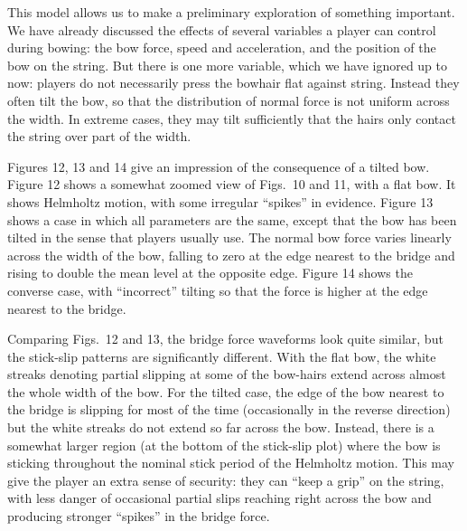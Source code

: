
  This model allows us to make a preliminary exploration of something 
  important. We have already discussed the effects of several variables a 
  player can control during bowing: the bow force, speed and acceleration, and 
  the position of the bow on the string. But there is one more variable, which 
  we have ignored up to now: players do not necessarily press the bowhair flat 
  against string. Instead they often tilt the bow, so that the distribution of 
  normal force is not uniform across the width. In extreme cases, they may tilt 
  sufficiently that the hairs only contact the string over part of the width. 

  Figures 12, 13 and 14 give an impression of the consequence of a tilted bow. 
  Figure 12 shows a somewhat zoomed view of Figs.\ 10 and 11, with a flat bow. 
  It shows Helmholtz motion, with some irregular “spikes” in evidence. Figure 
  13 shows a case in which all parameters are the same, except that the bow has 
  been tilted in the sense that players usually use. The normal bow force 
  varies linearly across the width of the bow, falling to zero at the edge 
  nearest to the bridge and rising to double the mean level at the opposite 
  edge. Figure 14 shows the converse case, with “incorrect” tilting so that the 
  force is higher at the edge nearest to the bridge. 

  Comparing Figs.\ 12 and 13, the bridge force waveforms look quite similar, 
  but the stick-slip patterns are significantly different. With the flat bow, 
  the white streaks denoting partial slipping at some of the bow-hairs extend 
  across almost the whole width of the bow. For the tilted case, the edge of 
  the bow nearest to the bridge is slipping for most of the time (occasionally 
  in the reverse direction) but the white streaks do not extend so far across 
  the bow. Instead, there is a somewhat larger region (at the bottom of the 
  stick-slip plot) where the bow is sticking throughout the nominal stick 
  period of the Helmholtz motion. This may give the player an extra sense of 
  security: they can “keep a grip” on the string, with less danger of 
  occasional partial slips reaching right across the bow and producing stronger 
  “spikes” in the bridge force. 

